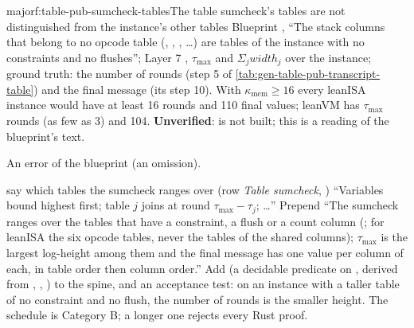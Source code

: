 \begin{finding}{major}{f:table-pub-sumcheck-tables}{The table sumcheck's tables are not distinguished from the instance's other tables}
 Blueprint , ``The stack columns that belong to no opcode table
(, , ,  …) are tables
of the instance with no constraints and no flushes''; Layer 7 , $τ_{\max}$ and
$Σ_j \mathit{width}_j$ over the instance; ground truth: the number of rounds (step 5 of \cref{tab:gen-table-pub-transcript-table}) and the final message (its step 10). With $κ_{\mathrm{mem}} ≥ 16$
every leanISA instance would have at least 16 rounds and 110 final values; leanVM has $τ_{\max}$
rounds (as few as 3) and 104. \textbf{Unverified}:  is not built; this is a
reading of the blueprint's text.

 An error of the blueprint (an omission).

\begin{change}{say which tables the sumcheck ranges over}
\asis (row \emph{Table sumcheck}, ) ``Variables bound highest first; table $j$
joins at round $τ_{\max} − τ_j$; …''
\asproposed Prepend ``The sumcheck ranges over the tables that have a constraint, a flush or a
count column (; for leanISA the six opcode tables, never the tables of the
shared columns); $τ_{\max}$ is the largest log-height among them and the final message has one
value per column of each, in table order then column order.'' Add  (a
decidable predicate on , derived from , ,
) to the spine, and an acceptance test: on an instance with a taller table of no
constraint and no flush, the number of rounds is the smaller height.
\reason The schedule is Category B; a longer one rejects every Rust proof.
\end{change}
\end{finding}

